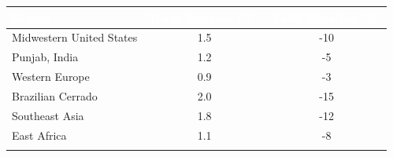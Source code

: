 \documentclass[border=10pt]{standalone}
\begin{document}
\begin{tabular}{>{}l S[table-format=1.1] S[table-format=-2.0]}
\toprule
{}
\textcolor{white}{\textbf{Region}} & {\textcolor{white}{\textbf{Temp. Increase (\si{\celsius})}}} & {\textcolor{white}{\textbf{Yield Variation (\%)}}} \\
\midrule
Midwestern United States & 1.5 & -10 \\
Punjab, India & 1.2 & -5 \\
Western Europe & 0.9 & -3 \\
Brazilian Cerrado & 2.0 & -15 \\
Southeast Asia & 1.8 & -12 \\
East Africa & 1.1 & -8 \\
\bottomrule
{} \\
\end{tabular}
\end{document}

